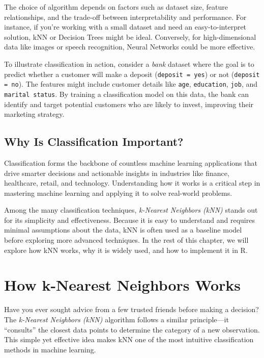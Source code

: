 \documentclass[
]{book}
\newcommand{\passthrough}[1]{#1}
\theoremstyle{definition}
\theoremstyle{definition}
\theoremstyle{definition}
\theoremstyle{definition}
\theoremstyle{remark}
\begin{document}
The choice of algorithm depends on factors such as dataset size, feature relationships, and the trade-off between interpretability and performance. For instance, if you're working with a small dataset and need an easy-to-interpret solution, kNN or Decision Trees might be ideal. Conversely, for high-dimensional data like images or speech recognition, Neural Networks could be more effective.

To illustrate classification in action, consider a \emph{bank} dataset where the goal is to predict whether a customer will make a deposit (\passthrough{\lstinline!deposit = yes!}) or not (\passthrough{\lstinline!deposit = no!}). The features might include customer details like \passthrough{\lstinline!age!}, \passthrough{\lstinline!education!}, \passthrough{\lstinline!job!}, and \passthrough{\lstinline!marital status!}. By training a classification model on this data, the bank can identify and target potential customers who are likely to invest, improving their marketing strategy.

\subsection*{Why Is Classification Important?}\label{why-is-classification-important}

Classification forms the backbone of countless machine learning applications that drive smarter decisions and actionable insights in industries like finance, healthcare, retail, and technology. Understanding how it works is a critical step in mastering machine learning and applying it to solve real-world problems.

Among the many classification techniques, \emph{k-Nearest Neighbors (kNN)} stands out for its simplicity and effectiveness. Because it is easy to understand and requires minimal assumptions about the data, kNN is often used as a baseline model before exploring more advanced techniques. In the rest of this chapter, we will explore how kNN works, why it is widely used, and how to implement it in R.

\section{How k-Nearest Neighbors Works}\label{how-k-nearest-neighbors-works}

Have you ever sought advice from a few trusted friends before making a decision? The \emph{k-Nearest Neighbors (kNN)} algorithm follows a similar principle---it ``consults'' the closest data points to determine the category of a new observation. This simple yet effective idea makes kNN one of the most intuitive classification methods in machine learning.
\end{document}
